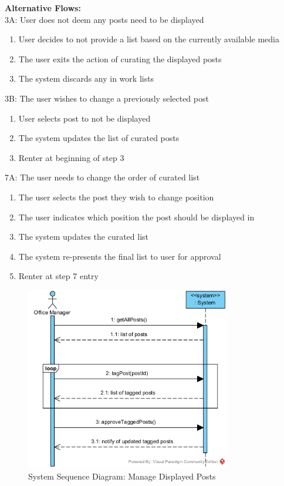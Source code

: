 \textbf{Alternative Flows:} \\
3A: User does not deem any posts need to be displayed
\begin{enumerate}
    \item User decides to not provide a list based on the currently available media
    \item The user exits the action of curating the displayed posts
    \item The system discards any in work lists
\end{enumerate}
3B: The user wishes to change a previously selected post
\begin{enumerate}
    \item User selects post to not be displayed
    \item The system updates the list of curated posts
    \item Renter at beginning of step 3
\end{enumerate}
7A: The user needs to change the order of curated list
\begin{enumerate}
    \item The user selects the post they wish to change position
    \item The user indicates which position the post should be displayed in
    \item The system updates the curated list
    \item The system re-presents the final list to user for approval
    \item Renter at step 7 entry
\end{enumerate}

\begin{figure}[H]
    \centering
    \includegraphics[width=0.8\textwidth]{images/SSD-UC15-ManageDisplayedPosts.png}
    \centering
    \caption{System Sequence Diagram: Manage Displayed Posts}
\end{figure}

